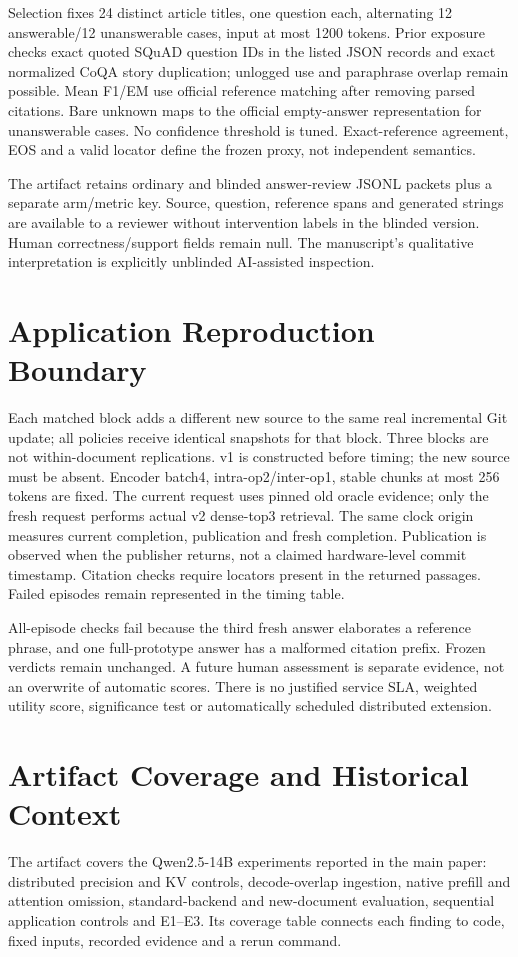 \documentclass{article}
\begin{document}
Selection fixes 24 distinct article titles, one question each, alternating 12
answerable/12 unanswerable cases, input at most 1200 tokens. Prior exposure
checks exact quoted SQuAD question IDs in the listed JSON records and exact
normalized CoQA story duplication; unlogged use and paraphrase overlap remain
possible. Mean F1/EM use official reference matching after removing parsed
citations. Bare unknown maps to the official empty-answer representation for
unanswerable cases. No confidence threshold is tuned. Exact-reference agreement,
EOS and a valid locator define the frozen proxy, not independent semantics.

The artifact retains ordinary and blinded answer-review JSONL packets plus a
separate arm/metric key. Source, question, reference spans and generated strings
are available to a reviewer without intervention labels in the blinded version.
Human correctness/support fields remain null. The manuscript's qualitative
interpretation is explicitly unblinded AI-assisted inspection.

\section{Application Reproduction Boundary}
Each matched block adds a different new source to the same real incremental
Git update; all policies receive identical snapshots for that block. Three
blocks are not within-document replications. v1 is constructed before timing;
the new source must be absent. Encoder batch4, intra-op2/inter-op1, stable
chunks at most 256 tokens are fixed. The current request uses pinned old oracle
evidence; only the fresh request performs actual v2 dense-top3 retrieval.
The same clock origin measures current completion, publication and fresh
completion. Publication is observed when the publisher returns, not a claimed
hardware-level commit timestamp. Citation checks require locators present in
the returned passages. Failed episodes remain represented in the timing table.

All-episode checks fail because the third fresh answer elaborates a reference
phrase, and one full-prototype answer has a malformed citation prefix. Frozen
verdicts remain unchanged. A future human assessment is separate evidence, not
an overwrite of automatic scores. There is no justified service SLA, weighted
utility score, significance test or automatically scheduled distributed extension.

\section{Artifact Coverage and Historical Context}
The artifact covers the Qwen2.5-14B experiments reported in the main paper:
distributed precision and KV controls, decode-overlap ingestion, native
prefill and attention omission, standard-backend and new-document evaluation,
sequential application controls and E1--E3. Its coverage table connects each
finding to code, fixed inputs, recorded evidence and a rerun command.
\end{document}

